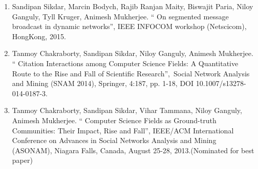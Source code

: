\begin{enumerate}
   \item  Sandipan Sikdar, Marcin Bodych, Rajib Ranjan Maity, Biswajit Paria, Niloy Ganguly, Tyll Kruger, Animesh Mukherjee. `` On segmented message broadcast 
   in dynamic networks'', IEEE INFOCOM workshop (Netscicom), HongKong, 2015.
   \item  Tanmoy Chakraborty, Sandipan Sikdar, Niloy Ganguly, Animesh Mukherjee. `` Citation Interactions among Computer Science Fields: A Quantitative Route to the Rise and Fall of Scientific Research'', Social Network Analysis and Mining (SNAM 2014), Springer, 4:187, pp. 1-18, DOI 10.1007/s13278-014-0187-3.
   \item  Tanmoy Chakraborty, Sandipan Sikdar, Vihar Tammana, Niloy Ganguly, Animesh Mukherjee. `` Computer Science Fields as Ground-truth Communities: Their Impact, Rise and Fall'', IEEE/ACM International Conference on Advances in Social Networks Analysis and Mining (ASONAM), Niagara Falls, Canada, August 25-28, 2013.(Nominated for best paper)
\end{enumerate}

